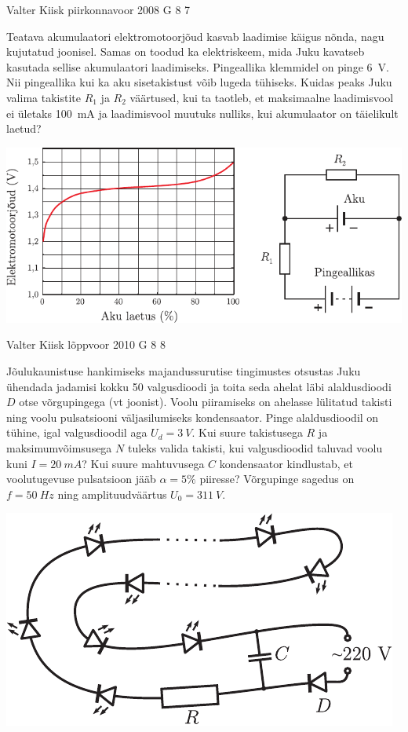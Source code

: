 \documentclass[11pt]{article}
\begin{document}
{%
{Valter Kiisk} %
{piirkonnavoor} %
{2008} %
{G 8} %
{7} %
{
\ifStatement
Teatava akumulaatori elektromotoorjõud kasvab laadimise käigus nõnda, nagu kujutatud joonisel. Samas on toodud ka elektriskeem, mida Juku kavatseb kasutada sellise akumulaatori laadimiseks. Pingeallika klemmidel on pinge \SI{6}{V}. Nii pingeallika kui ka aku sisetakistust võib lugeda tühiseks. Kuidas peaks Juku valima takistite $R_1$ ja $R_2$ väärtused, kui ta taotleb, et maksimaalne laadimisvool ei ületaks \SI{100}{mA} ja laadimisvool muutuks nulliks, kui akumulaator on täielikult laetud? 

\begin{center}
	\includegraphics[width=\linewidth]{2008-v2g-08-yl}
\end{center}
\fi
}

{Valter Kiisk} %
{lõppvoor} %
{2010} %
{G 8} %
{8} %
{
\ifStatement
Jõulukaunistuse hankimiseks majandussurutise tingimustes otsustas Juku
ühendada jadamisi kokku 50 valgusdioodi ja toita seda ahelat läbi alaldusdioodi $D$ otse
võrgupingega (vt joonist). Voolu piiramiseks on ahelasse lülitatud takisti
ning voolu pulsatsiooni väljasilumiseks kondensaator. Pinge alaldusdioodil on
tühine, igal valgusdioodil aga $U_d=\SI{3}{V}$. Kui suure takistusega $R$ ja maksimumvõimsusega $N$ tuleks valida
takisti, kui valgusdioodid taluvad voolu kuni $I=\SI{20}{mA}$? Kui suure mahtuvusega $C$
kondensaator kindlustab, et voolutugevuse pulsatsioon jääb $\alpha=\num{5}\%$ piiresse? Võrgupinge
sagedus on $f=\SI{50}{Hz}$ ning amplituudväärtus $U_0=\SI{311}{V}$.

\begin{center}
	\includegraphics[scale=0.75]{2010-v3g-08-elektrikuunlad2}
\end{center}
\fi
}

}
\end{document}
